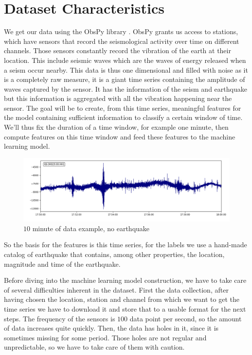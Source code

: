 \documentclass[10pt,conference,compsocconf]{IEEEtran}
\begin{document}
\section{Dataset Characteristics}
We get our data using the ObsPy library \cite{obspy}. ObsPy grants us access to stations, which have sensors that record the seismological activity over time on different channels. Those sensors constantly record  the vibration of the earth at their location. This include seismic waves which are the waves of energy released when a seism occur nearby. This data is thus one dimensional and filled with noise as it is a completely raw measure, it is a giant time series containing the amplitude of waves captured by the sensor. It has the information of the seism and earthquake but this information is aggregated with all the vibration happening near the sensor. The goal will be to create, from this time series, meaningful features for the model containing sufficient information to classify a certain window of time. We'll thus fix the duration of a time window, for example one minute, then compute features on this time window and feed these features to the machine learning model.

\begin{figure}[h]
  \centering
	\includegraphics[width=\columnwidth]{10min-example-2018-06-30T17:50_1.png}
  \caption{$10$ minute of data example, no earthquake}
	\label{fig:10min-example}
\end{figure}

So the basis for the features is this time series, for the labels we use a hand-made catalog of earthquake that contains, among other properties, the location, magnitude and time of the earthquake.

Before diving into the machine learning model construction, we have to take care of several difficulties inherent in the dataset.\newline
First the data collection, after having chosen the location, station and channel from which we want to get the time series we have to download it and store that to a usable format for the next steps. The frequency of the sensors is $100$ data point per second, so the amount of data increases quite quickly. Then, the data has holes in it, since it is sometimes missing for some period. Those holes are not regular and unpredictable, so we have to take care of them with caution.
\end{document}

